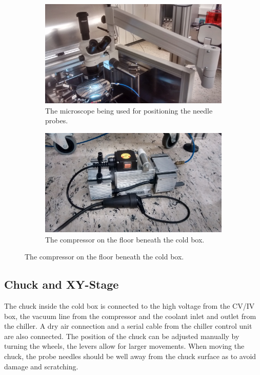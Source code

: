\documentclass[a4paper]{article}
\begin{document}
\begin{figure}[hbtp]
\centering
\begin{subfigure}[t]{0.475\textwidth}
\centering\captionsetup{width=.8\linewidth}%
\includegraphics[width=\linewidth]{pictures/microscope.jpg}
\caption[The Microscope]{The microscope being used for positioning the needle probes.}
\label{fig:microscope}
\end{subfigure}
\begin{subfigure}[t]{0.475\textwidth}
\centering\captionsetup{width=.8\linewidth}%
\includegraphics[width=\linewidth]{pictures/compressor.jpg}
\caption[The Compressor]{The compressor on the floor beneath the cold box.}
\label{fig:compressor}
\end{subfigure}
\end{figure}

\subsection{Chuck and XY-Stage}
\label{sec:chuck}

The chuck inside the cold box is connected to the high voltage from the CV/IV box, the vacuum line from the compressor and the coolant inlet and outlet from the chiller.
A dry air connection and a serial cable from the chiller control unit are also connected.
The position of the chuck can be adjusted manually by turning the wheels, the levers allow for larger movements.
When moving the chuck, the probe needles should be well away from the chuck surface as to avoid damage and scratching.\\
\end{document}
